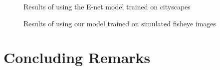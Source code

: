 \documentclass[a4paper, 12pt, oneside, BCOR1cm,toc=chapterentrywithdots]{scrbook}
\begin{document}
\begin{figure}[h] 
\caption{Results of using the E-net model trained on cityscapes} \label{lmsp1}
\end{figure}

\begin{figure}[h] 
\caption{Results of using our model trained on simulated fisheye images} \label{lmsp2}
\end{figure}




\chapter{Concluding Remarks}
\end{document}
